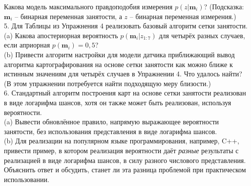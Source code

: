 \documentclass[10pt,a4paper]{article}
\begin{document}
Какова модель максимального правдоподобия измерения $p(z | \textbf{m}_i)$? (Подсказка: $\textbf{m}_i$ – бинарная переменная занятости, а $z$ – бинарная переменная измерения.)\\

5.	Для Таблицы из Упражнения 4 реализовать базовый алгоритм сетки занятости.\\

(a)	Какова апостериорная вероятность $p(\textbf{m}_i | z_{1:7})$ для четырёх разных случаев, если априорная $p(\textbf{m}_i) = 0,5$?\\

(b)	Привести алгоритм настройки для модели датчика приближающий вывод алгоритма картографирования на основе сетки занятости как можно ближе к истинным значениям для четырёх случаев в Упражнении 4. Что удалось найти? (В этом упражнении потребуется найти подходящую меру близости.)\\

6.	Стандартный алгоритм построения карт на основе сетки занятости реализован в виде логарифма шансов, хотя он также может быть реализован, используя вероятности.\\

(a)	Вывести обновлённое правило, напрямую выражающее вероятности занятости, без использования представления в виде логарифма шансов.\\

(b)	Для реализации на популярном языке программирования, например, C++, привести пример, в котором реализация вероятности даёт \textit{разные} результаты с реализацией в виде логарифма шансов, в силу разного числового представления. Объяснить ответ и обсудить, станет ли эта разница проблемой при практическом использовании.\\






 
\end{document}
